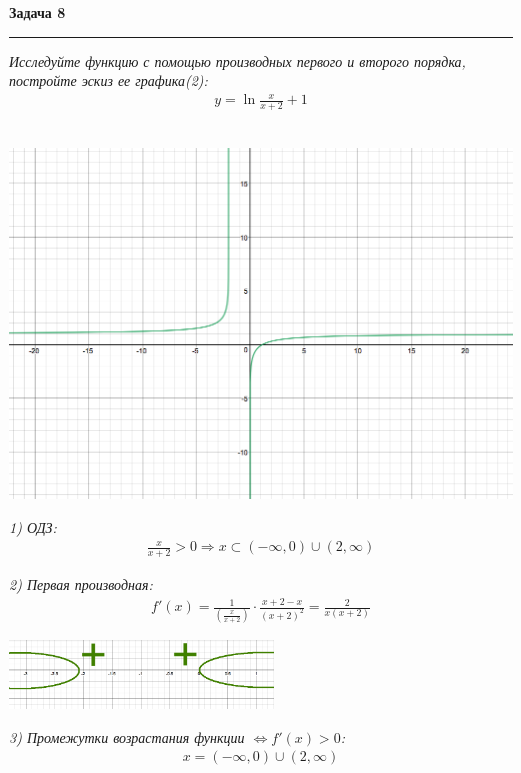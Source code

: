 \documentclass[a4paper,11pt]{article}
\begin{document}
\newpage
\textbf{\large Задача 8}
\medskip\hrule\medskip
\textsl{Исследуйте функцию с помощью производных первого и второго порядка, постройте эскиз ее графика(2):}
\begin{align*}
y = \ln \frac{x}{x + 2} + 1
\end{align*} \\

\begin{center}
	\includegraphics[width = 150mm]{images/81.png}
\end{center}

\noindent \textsl{1) ОДЗ:}
\begin{gather*}
	\frac{x}{x + 2} > 0 \Rightarrow x \subset (-\infty, 0) \cup (2, \infty)
\end{gather*}

\noindent \textsl{2) Первая производная:}
\begin{gather*}
f'(x) = \frac{1}{(\frac{x}{x + 2})} \cdot \frac{x + 2 - x}{(x + 2)^2} = \frac{2}{x(x + 2)}
\end{gather*} 
\begin{center}
	\includegraphics[width = 70mm]{images/82.png}
\end{center}

\noindent \textsl{3) Промежутки возрастания функции   $\Longleftrightarrow f'(x) > 0 $:}
\begin{gather*}
x = (-\infty, 0) \cup (2, \infty)
\end{gather*}
\end{document}
